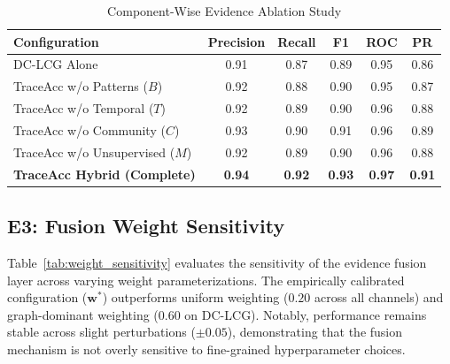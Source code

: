 \documentclass[journal]{IEEEtran}
\begin{document}
\begin{table}[t]
\centering
\caption{Component-Wise Evidence Ablation Study}
\label{tab:ablation}
\begin{tabular}{lccccc}
\toprule
\textbf{Configuration} & \textbf{Precision} & \textbf{Recall} & \textbf{F1} & \textbf{ROC} & \textbf{PR} \\
\midrule
DC-LCG Alone & 0.91 & 0.87 & 0.89 & 0.95 & 0.86 \\
TraceAcc w/o Patterns ($B$) & 0.92 & 0.88 & 0.90 & 0.95 & 0.87 \\
TraceAcc w/o Temporal ($T$) & 0.92 & 0.89 & 0.90 & 0.96 & 0.88 \\
TraceAcc w/o Community ($C$) & 0.93 & 0.90 & 0.91 & 0.96 & 0.89 \\
TraceAcc w/o Unsupervised ($M$) & 0.92 & 0.89 & 0.90 & 0.96 & 0.88 \\
\textbf{TraceAcc Hybrid (Complete)} & \textbf{0.94} & \textbf{0.92} & \textbf{0.93} & \textbf{0.97} & \textbf{0.91} \\
\bottomrule
\end{tabular}
\end{table}

\subsection{E3: Fusion Weight Sensitivity}
Table~\ref{tab:weight_sensitivity} evaluates the sensitivity of the evidence fusion layer across varying weight parameterizations. The empirically calibrated configuration ($\mathbf{w}^*$) outperforms uniform weighting ($0.20$ across all channels) and graph-dominant weighting ($0.60$ on DC-LCG). Notably, performance remains stable across slight perturbations ($\pm 0.05$), demonstrating that the fusion mechanism is not overly sensitive to fine-grained hyperparameter choices.

\begin{table}[t]
\centering
\caption{Sensitivity Analysis Across Weight Configurations}
\label{tab:weight_sensitivity}
\end{table}
\end{document}
